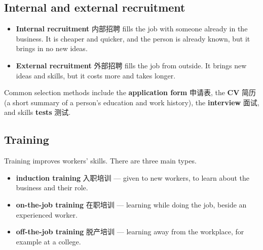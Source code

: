 \documentclass[11pt]{article}
\begin{document}
\subsection*{Internal and external recruitment}

\begin{itemize}
\item \textbf{Internal recruitment} 内部招聘 fills the job with someone already in the business. It is cheaper and quicker, and the person is already known, but it brings in no new ideas.

\item \textbf{External recruitment} 外部招聘 fills the job from outside. It brings new ideas and skills, but it costs more and takes longer.

\end{itemize}

Common selection methods include the \textbf{application form} 申请表, the \textbf{CV} 简历 (a short summary of a person's education and work history), the \textbf{interview} 面试, and skills \textbf{tests} 测试.

\subsection*{Training}

Training improves workers' skills. There are three main types.

\begin{itemize}
\item \textbf{induction training} 入职培训 — given to new workers, to learn about the business and their role.

\item \textbf{on-the-job training} 在职培训 — learning while doing the job, beside an experienced worker.

\item \textbf{off-the-job training} 脱产培训 — learning away from the workplace, for example at a college.

\end{itemize}

\begin{center}
\end{center}
\end{document}
